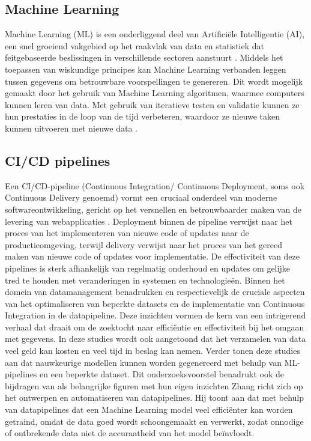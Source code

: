 \subsection{Machine Learning}
Machine Learning (ML) is een onderliggend deel van Artificiële Intelligentie (AI), een snel groeiend vakgebied op het raakvlak van data en statistiek dat feitgebaseerde beslissingen in verschillende sectoren aanstuurt \autocite{Jordan2015}.
Middels het toepassen van wiskundige principes kan Machine Learning verbanden leggen tussen gegevens om betrouwbare voorspellingen te genereren. Dit wordt mogelijk gemaakt door het gebruik van Machine Learning algoritmen, waarmee computers kunnen leren van data. Met gebruik van iteratieve testen en validatie kunnen ze hun prestaties in de loop van de tijd verbeteren, waardoor ze nieuwe taken kunnen uitvoeren met nieuwe data \autocite{Shaveta2023}.
\subsection{CI/CD pipelines}
Een CI/CD-pipeline (Continuous Integration/ Continuous Deployment, soms ook Continuous Delivery genoemd) vormt een cruciaal onderdeel van moderne softwareontwikkeling, gericht op het versnellen en betrouwbaarder maken van de levering van webapplicaties \autocite{Singh2023}. Deployment binnen de pipeline verwijst naar het proces van het implementeren van nieuwe code of updates naar de productieomgeving, terwijl delivery verwijst naar het proces van het gereed maken van nieuwe code of updates voor implementatie. De effectiviteit van deze pipelines is sterk afhankelijk van regelmatig onderhoud en updates om gelijke tred te houden met veranderingen in systemen en technologieën. Binnen het domein van datamanagement benadrukken \textcite{Samad2018} en \textcite{Vadavalasa2020} respectievelijk de cruciale aspecten van het optimaliseren van beperkte datasets en de implementatie van Continuous Integration in de datapipeline. Deze inzichten vormen de kern van een intrigerend verhaal dat draait om de zoektocht naar efficiëntie en effectiviteit bij het omgaan met gegevens. In deze studies wordt ook aangetoond dat het verzamelen van data veel geld kan kosten en veel tijd in beslag kan nemen. Verder tonen deze studies aan dat nauwkeurige modellen kunnen worden gegenereerd met behulp van ML-pipelines en een beperkte dataset. Dit onderzoeksvoorstel benadrukt ook de bijdragen van \textcite{Zhang2022} als belangrijke figuren met hun eigen inzichten
Zhang richt zich op het ontwerpen en automatiseren van datapipelines. Hij toont aan dat met behulp van datapipelines dat een Machine Learning model veel efficiënter kan worden getraind, omdat de data goed wordt schoongemaakt en verwerkt, zodat onnodige of ontbrekende data niet de accuraatheid van het model beïnvloedt.
